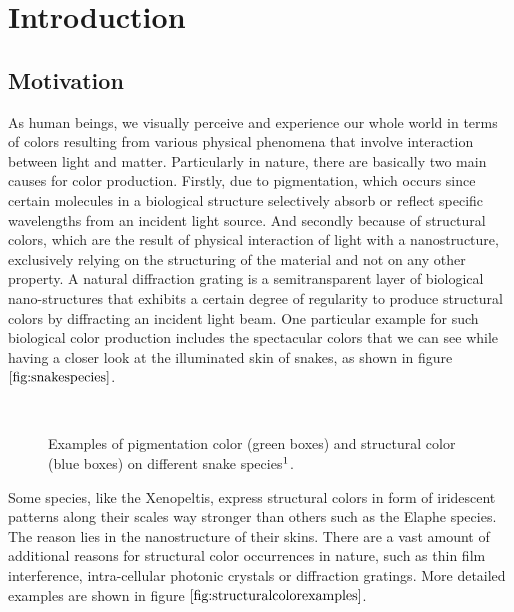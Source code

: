 \chapter{Introduction}
\section{Motivation}
As human beings, we visually perceive and experience our whole world in terms of colors resulting from various physical phenomena that involve interaction between light and matter. Particularly in nature, there are basically two main causes for color production. Firstly, due to pigmentation, which occurs since certain molecules in a biological structure selectively absorb or reflect specific wavelengths from an incident light source. And secondly because of structural colors, which are the result of physical interaction of light with a nanostructure, exclusively relying on the structuring of the material and not on any other property. A natural diffraction grating is a semitransparent layer of biological nano-structures that exhibits a certain degree of regularity to produce structural colors by diffracting an incident light beam. One particular example for such biological color production includes the spectacular colors that we can see while having a closer look at the illuminated skin of snakes, as shown in figure $\ref{fig:snakespecies}$.

\begin{figure}[H]
  \centering
~
  \caption[Example of Biological Color Production]{Examples of pigmentation color (green boxes) and structural color (blue boxes) on different snake species$\footnotemark$.}
  \label{fig:snakespecies}
\end{figure}

Some species, like the Xenopeltis, express structural colors in form of iridescent patterns along their scales way stronger than others such as the Elaphe species. The reason lies in the nanostructure of their skins. There are a vast amount of additional reasons for structural color occurrences in nature, such as thin film interference, intra-cellular photonic crystals or diffraction gratings. More detailed examples are shown in figure $\ref{fig:structuralcolorexamples}$. 

